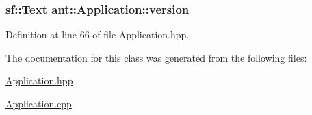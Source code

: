 \hypertarget{classant_1_1_application_a1d16f830e0f443b71d7c654681857e0d}{
\subsubsection[{version}]{\setlength{\rightskip}{0pt plus 5cm}sf\+::\+Text ant\+::\+Application\+::version\hspace{0.3cm}{\ttfamily [private]}}}\label{classant_1_1_application_a1d16f830e0f443b71d7c654681857e0d}


Definition at line 66 of file Application.\+hpp.



The documentation for this class was generated from the following files\+:\begin{DoxyCompactItemize}
\item 
\hyperlink{_application_8hpp}{Application.\+hpp}\item 
\hyperlink{_application_8cpp}{Application.\+cpp}\end{DoxyCompactItemize}
